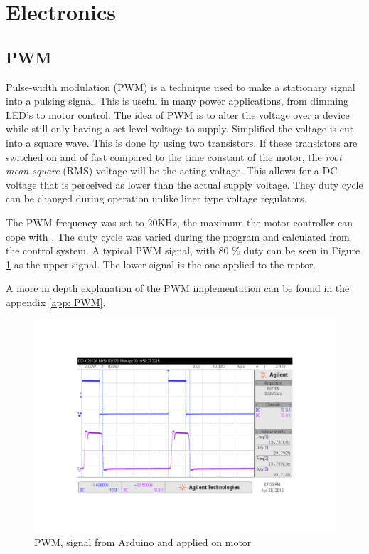 \documentclass[a4paper,11pt]{kth-mag}
\begin{document}
\section{Electronics}



\subsection{PWM}
Pulse-width modulation (PWM) is a technique used to make a stationary signal into a pulsing signal.
This is useful in many power applications, from dimming LED's to motor control. The idea of 
PWM is to alter the voltage over a device while still only having a set level voltage to supply. Simplified  
the voltage is cut into a square wave. This is done by using two transistors\cite{elektro}. If these transistors are switched on and of fast 
compared to the time constant of the motor, the \textit{root mean square} (RMS) voltage will be the acting voltage.
This allows for a DC voltage that is perceived as lower than the actual supply voltage.
They duty cycle can be changed during operation unlike liner type voltage regulators.

The PWM frequency was set to 20KHz, the maximum the motor controller can cope with \cite{MC33926}. The duty cycle was varied during the program and calculated from the control system. A typical PWM signal, with 80 \%  duty can be seen in Figure \ref{Fig: PWMscope} as the upper signal. The lower signal is the one applied to the motor.

A more in depth explanation of the PWM implementation can be found in the appendix \ref{app: PWM}.
\begin{figure}[!hbt]
\centering
\includegraphics[trim=5cm 5.5cm 5cm 5cm, clip=true,scale=0.15]{PWMpic1.jpg}
\caption{PWM, signal from Arduino and applied on motor}
\label{Fig: PWMscope}
\end{figure} 
\end{document}
